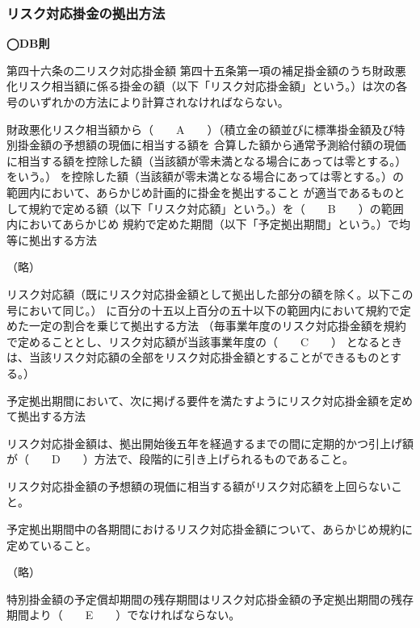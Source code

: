 \subsubsection{リスク対応掛金の拠出方法}

\begin{fillblank}[年金2 H29 問題1(3)]
  \noindent \textbf{◯DB則}
  \begin{lawstructure}
    \begin{lawarticle}{第四十六条の二}{リスク対応掛金額}
      第四十五条第一項の補足掛金額のうち財政悪化リスク相当額に係る掛金の額（以下「リスク対応掛金額」という。）は次の各号のいずれかの方法により計算されなければならない。
    
      財政悪化リスク相当額から（　　A　　）（積立金の額並びに標準掛金額及び特別掛金額の予想額の現価に相当する額を
      合算した額から通常予測給付額の現価に相当する額を控除した額（当該額が零未満となる場合にあっては零とする。）をいう。）
      を控除した額（当該額が零未満となる場合にあっては零とする。）の範囲内において、あらかじめ計画的に掛金を拠出すること
      が適当であるものとして規約で定める額（以下「リスク対応額」という。）を（　　B　　）の範囲内においてあらかじめ
      規約で定めた期間（以下「予定拠出期間」という。）で均等に拠出する方法

      （略）

      リスク対応額（既にリスク対応掛金額として拠出した部分の額を除く。以下この号において同じ。）
      に百分の十五以上百分の五十以下の範囲内において規約で定めた一定の割合を乗じて拠出する方法
      （毎事業年度のリスク対応掛金額を規約で定めることとし、リスク対応額が当該事業年度の（　　C　　）
      となるときは、当該リスク対応額の全部をリスク対応掛金額とすることができるものとする。）

      予定拠出期間において、次に掲げる要件を満たすようにリスク対応掛金額を定めて拠出する方法

      リスク対応掛金額は、拠出開始後五年を経過するまでの間に定期的かつ引上げ額が（　　D　　）方法で、段階的に引き上げられるものであること。

      リスク対応掛金額の予想額の現価に相当する額がリスク対応額を上回らないこと。

      予定拠出期間中の各期間におけるリスク対応掛金額について、あらかじめ規約に定めていること。

      （略）


      特別掛金額の予定償却期間の残存期間はリスク対応掛金額の予定拠出期間の残存期間より（　　E　　）でなければならない。
    \end{lawarticle}
  \end{lawstructure}
\end{fillblank}


